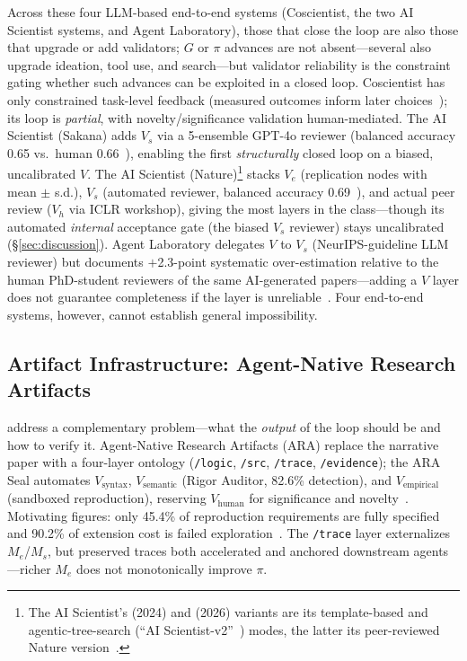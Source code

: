 \documentclass{article}
\begin{document}
\noindent Across these four LLM-based end-to-end systems (Coscientist, the two AI Scientist systems, and Agent Laboratory), those that close the loop are also those that upgrade or add validators; $G$ or $\pi$ advances are not absent---several also upgrade ideation, tool use, and search---but validator reliability is the constraint gating whether such advances can be exploited in a closed loop. Coscientist has only constrained task-level feedback (measured outcomes inform later choices~\citep{boiko2023emergent}); its loop is \emph{partial}, with novelty/significance validation human-mediated. The AI Scientist (Sakana) adds $V_s$ via a 5-ensemble GPT-4o reviewer (balanced accuracy 0.65 vs.\ human 0.66~\citep{lu2024aiscientist}), enabling the first \emph{structurally} closed loop on a biased, uncalibrated $V$. The AI Scientist (Nature)\footnote{The AI Scientist's (2024) and (2026) variants are its template-based and agentic-tree-search (``AI Scientist-v2''~\citep{yamada2025aiscientistv2}) modes, the latter its peer-reviewed Nature version~\citep{lu2026aiscientist}.} stacks $V_e$ (replication nodes with mean $\pm$ s.d.), $V_s$ (automated reviewer, balanced accuracy 0.69~\citep{lu2026aiscientist}), and actual peer review ($V_h$ via ICLR workshop), giving the most layers in the class---though its automated \emph{internal} acceptance gate (the biased $V_s$ reviewer) stays uncalibrated (\S\ref{sec:discussion}). Agent Laboratory delegates $V$ to $V_s$ (NeurIPS-guideline LLM reviewer) but documents $+$2.3-point systematic over-estimation relative to the human PhD-student reviewers of the same AI-generated papers---adding a $V$ layer does not guarantee completeness if the layer is unreliable~\citep{schmidgall2025agentlab}. Four end-to-end systems, however, cannot establish general impossibility.

\subsection{Artifact Infrastructure: Agent-Native Research Artifacts}
\label{sec:ara}

\citet{liu2026lasthuman} address a complementary problem---what the \emph{output} of the loop should be and how to verify it. Agent-Native Research Artifacts (ARA) replace the narrative paper with a four-layer ontology (\texttt{/logic}, \texttt{/src}, \texttt{/trace}, \texttt{/evidence}); the ARA Seal automates $V_\text{syntax}$, $V_\text{semantic}$ (Rigor Auditor, 82.6\% detection), and $V_\text{empirical}$ (sandboxed reproduction), reserving $V_\text{human}$ for significance and novelty~\citep{liu2026lasthuman}. Motivating figures: only 45.4\% of reproduction requirements are fully specified and 90.2\% of extension cost is failed exploration~\citep{liu2026lasthuman}. The \texttt{/trace} layer externalizes $M_e$/$M_s$, but preserved traces both accelerated and anchored downstream agents---richer $M_e$ does not monotonically improve $\pi$.
\end{document}
